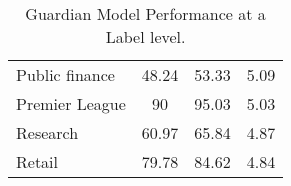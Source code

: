 \begin{table}[htbp]
\begin{tabular}{l|c|c|c|}
Public finance             & 48.24                                                            & 53.33                                                        & 5.09                                                              \\
Premier League             & 90                                                               & 95.03                                                        & 5.03                                                              \\
Research                   & 60.97                                                            & 65.84                                                        & 4.87                                                              \\
Retail                     & 79.78                                                            & 84.62                                                        & 4.84                                                             
\end{tabular}
\caption{\label{tab:widgets}Guardian Model Performance at a Label level.}
\end{table}

